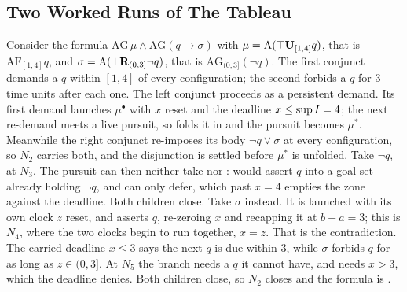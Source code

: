 
\newcommand{\rl}[1]{\ensuremath{\rlink{#1}}}

\subsection{Two Worked Runs of The Tableau}\label{ss:ex}


Consider the formula $\mathrm{AG}\,\mu\wedge\mathrm{AG}(q\rightarrow\sigma)$ with $\mu=\tAU{\top}{q}{[1,4]}$, that is $\mathrm{AF}_{[1,4]}q$, and 
$\sigma=\tAR{\bot}{\neg q}{(0,3]}$, that is $\mathrm{AG}_{(0,3]}(\lnot q)$. The first conjunct demands a $q$ within
$[1,4]$ of every configuration; the second forbids a $q$ for $3$ time units after each one. The left conjunct proceeds as a persistent demand. Its first demand launches $\mu^\bullet$ with $x$
reset and the deadline $x\le\sup\kI=4$; the next re-demand meets a live pursuit, so 
folds it in and the pursuit becomes $\mu^{\ast}$. Meanwhile the right conjunct re-imposes its body
$\neg q\vee\sigma$ at every configuration, so $N_2$ carries both, and the disjunction is settled
before $\mu^{\ast}$ is unfolded.
\noindent
Take $\neg q$, at $N_3$. The pursuit can then neither take  nor :  would assert
$q$ into a goal set already holding $\neg q$, and  can only defer, which past $x=4$
empties the zone against the deadline. Both children close.
\noindent
Take $\sigma$ instead. It is launched with its own clock $z$ reset, and  asserts
$q$, re-zeroing $x$ and recapping it at $b-a=3$; this is $N_4$, where the two clocks begin to run
together, $x=z$. That is the contradiction. The carried deadline $x\le3$ says the next $q$ is due
within $3$, while $\sigma$ forbids $q$ for as long as $z\in(0,3]$. At $N_5$ the  branch needs a
$q$ it cannot have, and  needs $x>3$, which the deadline denies. Both children close,
so $N_2$ closes and the formula is \UNSAT.



